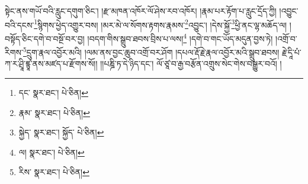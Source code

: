 སྟེང་ནས་གཡོ་བའི་རླུང་དགུག་ཅིང་། །རྫ་མཁན་འཁོར་ལོ་ཤེས་རབ་འཁོར། །རྣམ་པར་རྟོག་པ་རླུང་དྲོད་ཀྱི། །འབྱུང་བའི་དངས་\footnote{དང་  སྣར་ཐང་།  པེ་ཅིན། }སྙིགས་ཕྱེད་འགྱུར་བས། །མར་མེ་ལ་སོགས་རྟགས་རྣམས་\footnote{རྣམ་  སྣར་ཐང་།  པེ་ཅིན། }འབྱུང་། །དེས་སྐྱོ་\footnote{སྐྱེད་  སྣར་ཐང་། སྐྱོད་  པེ་ཅིན། }ཕྱི་ནང་ལྷ་མཆོད་ལ། །བསྟོད་ཅིང་དགེ་བ་བསྔོ་བར་བྱ། །བདག་གིས་སྒྲུབ་ཐབས་བྲིས་པ་ལས།\footnote{ལ།  སྣར་ཐང་།  པེ་ཅིན། } །དགེ་བ་གང་ཡོད་མདུན་བྱས་ཏེ། །འགྲོ་བ་རིགས་\footnote{རིས་  སྣར་ཐང་།  པེ་ཅིན། }དྲུག་རྣལ་འབྱོར་མའི། །ལམ་ནས་བྱང་ཆུབ་འགྲོ་བར་ཤོག །དཔལ་རྡོ་རྗེ་རྣལ་འབྱོར་མའི་སྒྲུབ་ཐབས། རྗེ་དཱི་པཾ་ཀ་ར་ཤྲཱི་ཛྙཱ་ནས་མཛད་པ་རྫོགས་སོ།། །།པཎྜི་ཏ་དེ་ཉིད་དང་། ལོ་ཙཱ་བ་རྒྱ་བརྩོན་འགྲུས་སེང་གེས་བསྒྱུར་བའོ། །